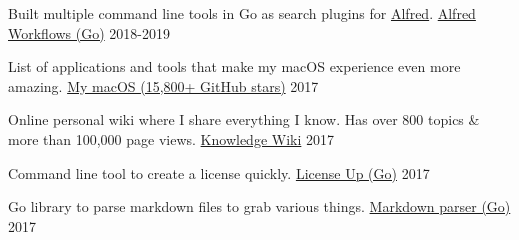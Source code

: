 
\begin{cventries}

  \cventry
    {Built multiple command line tools in Go as search plugins for \href{https://www.alfredapp.com}{Alfred}.}
    {\href{https://wiki.nikitavoloboev.xyz/sharing/my-github}{Alfred Workflows (Go)}}
    {}
    {2018-2019}
    {
    }

    \cventry
    {List of applications and tools that make my macOS experience even more amazing.}
    {\href{https://github.com/nikitavoloboev/my-mac-os}{My macOS (15,800+ GitHub stars)}}
    {}
    {2017}
    {
    }

    \cventry
    {Online personal wiki where I share everything I know. Has over 800 topics \& more than 100,000 page views.}
    {\href{https://wiki.nikitavoloboev.xyz}{Knowledge Wiki}}
    {}
    {2017}
    {
    }

    \cventry
    {Command line tool to create a license quickly.}
    {\href{https://github.com/nikitavoloboev/license-up}{License Up (Go)}}
    {}
    {2017}
    {
    }

    \cventry
    {Go library to parse markdown files to grab various things.}
    {\href{https://github.com/nikitavoloboev/markdown-parser}{Markdown parser (Go)}}
    {}
    {2017}
    {
    }

\end{cventries}
